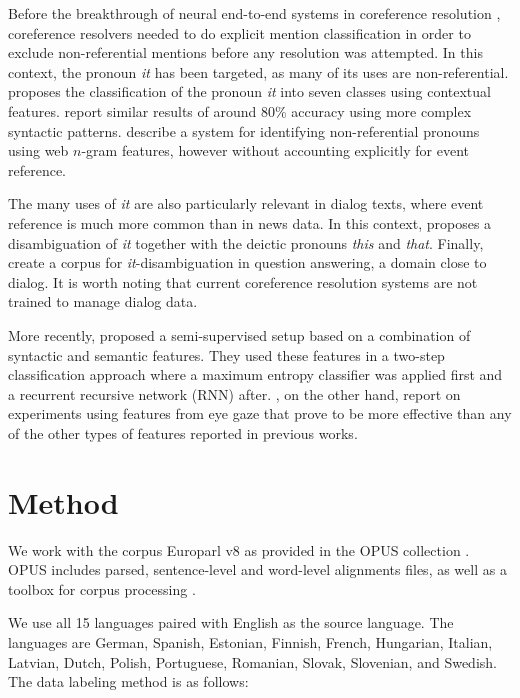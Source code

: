 \documentclass[10pt, a4paper]{article}
\begin{document}
%
% 
Before the breakthrough of neural end-to-end systems in coreference resolution
\cite{Lee:2017}, coreference resolvers needed to do explicit mention
classification in order to exclude non-referential mentions before any
resolution was attempted. In this context, the pronoun \textit{it} has been targeted,
as many of its uses are non-referential.  proposes the
classification of the pronoun \textit{it} into seven classes using contextual features.
 report similar results of around 80\% accuracy using more
complex syntactic patterns.  describe a system for
identifying non-referential pronouns using web $n$-gram features, however
without accounting explicitly for event reference.

The many uses of \textit{it} are also particularly relevant in dialog texts, where
event reference is much more common than in news data. In this context,
 proposes a disambiguation of \textit{it} together with
the deictic pronouns \textit{this} and \textit{that}.  Finally,  create a corpus
for \textit{it}-disambiguation in question answering, a domain close to dialog. It is
worth noting that current coreference resolution systems are not trained to
manage dialog data.

More recently,   proposed a semi-supervised setup
based on a combination of syntactic and semantic features. They used these features in a two-step
classification approach where a maximum entropy classifier was applied first and a
recurrent recursive network (RNN) after. ,
on the other hand, report on experiments using features from eye gaze that prove
to be more effective than any of the other types of features reported in
previous works.




\section{Method}

We work with the corpus Europarl \cite{Koehn2005} v8 as provided in the OPUS 
collection \cite{TIEDEMANN12.463}. OPUS includes parsed, sentence-level 
and word-level alignments files, as well as a toolbox for corpus processing 
\cite{aulamo-et-al-opus}. 

We use all 15 languages paired with English as the 
source language. The languages are German, Spanish, Estonian, Finnish, French, 
Hungarian, Italian, Latvian, Dutch, Polish, Portuguese, Romanian, Slovak, 
Slovenian, and Swedish. The data labeling method is as follows:
\end{document}
